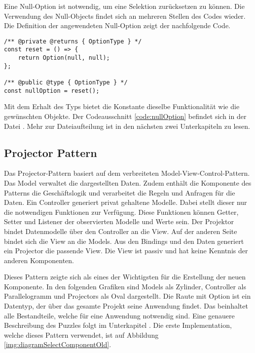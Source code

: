 Eine Null-Option ist notwendig, um eine Selektion zurücksetzen zu können. 
Die Verwendung des Null-Objects findet sich an mehreren Stellen des Codes wieder. 
Die Definition der angewendeten Null-Option zeigt der nachfolgende Code. 

\begin{lstlisting}[style = htmlcssjs, caption = Null-Option Definition, label = code:nullOption]
/** @private @returns { OptionType } */
const reset = () => {
    return Option(null, null);
};

/** @public @type { OptionType } */
const nullOption = reset();
\end{lstlisting}

Mit dem Erhalt des Typs  bietet die Konstante dieselbe Funktionalität wie die gewünschten Objekte. 
Der Codeausschnitt \ref{code:nullOption} befindet sich in der Datei . 
Mehr zur Dateiaufteilung ist in den nächsten zwei Unterkapiteln zu lesen. 


\subsection{Projector Pattern}
\label{sec:projectorPattern}

Das Projector-Pattern basiert auf dem verbreiteten Model-View-Control-Pattern. 
Das Model verwaltet die dargestellten Daten. 
Zudem enthält die Komponente des Patterns die Geschäftslogik und verarbeitet die Regeln und Anfragen für die Daten. 
Ein Controller generiert privat gehaltene Modelle. 
Dabei stellt dieser nur die notwendigen Funktionen zur Verfügung. 
Diese Funktionen können Getter, Setter und Listener der observierten Modelle und Werte sein. 
Der Projektor bindet Datenmodelle über den Controller an die View. 
Auf der anderen Seite bindet sich die View an die Models. 
Aus den Bindings und den Daten generiert ein Projector die passende View. 
Die View ist passiv und hat keine Kenntnis der anderen Komponenten. 

Dieses Pattern zeigte sich als eines der Wichtigsten für die Erstellung der neuen Komponente. 
In den folgenden Grafiken sind Models als Zylinder, Controller als Parallelogramm und Projectors als Oval dargestellt.
Die Raute mit Option ist ein Datentyp, der über das gesamte Projekt seine Anwendung findet. 
Das  beinhaltet alle Bestandteile, welche für eine Anwendung notwendig sind. 
Eine genauere Beschreibung des Puzzles folgt im Unterkapitel \textbf{}. 
Die erste Implementation, welche dieses Pattern verwendet, ist auf Abbildung \ref{img:diagramSelectComponentOld}. 

